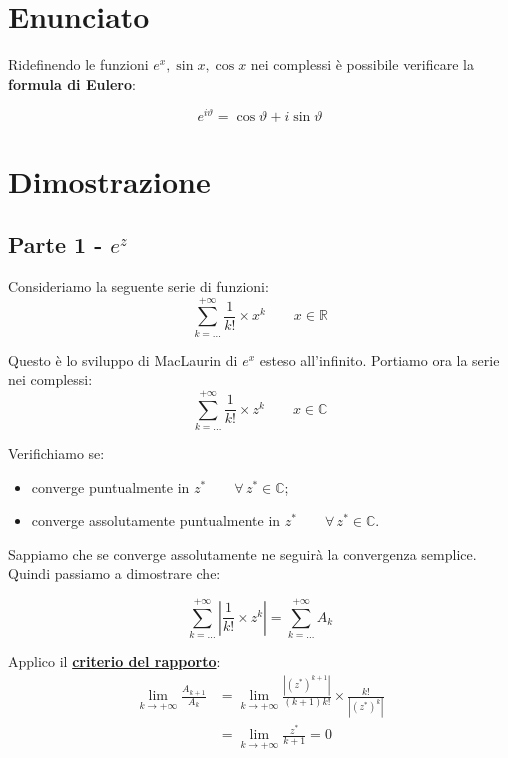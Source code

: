 \documentclass[../../dimostrazioni]{subfiles}
\begin{document}
        \section*{Enunciato}

            Ridefinendo le funzioni \( e^x, \sin x, \cos x \) nei complessi è possibile verificare la \textbf{formula di Eulero}:

                \[  e^{i\vartheta} = \cos \vartheta + i \sin \vartheta \]

        \section*{Dimostrazione}

            \subsection*{Parte 1 - \(e^z\)}    

                Consideriamo la seguente serie di funzioni:
                \[  \sum_{k=\dots}^{+\infty} \frac{1}{k!} \times x^k \qquad x \in \mathbb{R}  \]

                Questo è lo sviluppo di MacLaurin di \(e^x\) esteso all'infinito. Portiamo ora la serie nei complessi:
                \[  \sum_{k=\dots}^{+\infty} \frac{1}{k!} \times z^k \qquad x \in \mathbb{C}  \]

                Verifichiamo se:
                \begin{itemize}
                    \item converge puntualmente in \(z^* \qquad \forall \, z^*  \in \mathbb{C}\);
                    \item converge assolutamente puntualmente in \(z^* \qquad \forall \, z^*  \in \mathbb{C}\).
                \end{itemize}
            
                Sappiamo che se converge assolutamente ne seguirà la convergenza semplice. Quindi passiamo a dimostrare che:

                \[  \sum_{k=\dots}^{+\infty} \left| \frac{1}{k!} \times z^k \right| = \sum_{k=\dots}^{+\infty} A_k \]

                Applico il \textbf{\hyperref[criterioRapportoSerie]{criterio del rapporto}}:
                \begin{align*}
                    \lim_{k \to +\infty} \frac{A_{k+1}}{A_k} &= \lim_{k \to +\infty} \frac{\left|(z^*)^{k+1}\right|}{(k+1)k!} \times \frac{k!}{\left|(z^*)^k\right|} \\
                    &= \lim_{k \to +\infty} \frac{z^*}{k+1} = 0
                \end{align*}
\end{document}
